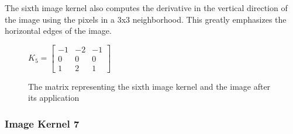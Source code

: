 \documentclass[12pt,letterpaper]{article}
\begin{document}
The sixth image kernel also computes the derivative in the vertical direction of the image using the pixels in a 3x3 neighborhood. This greatly emphasizes the horizontal edges of the image.
\begin{figure}[ht]
\centering
$K_5 = \begin{bmatrix}
-1 & -2 & -1\\
0 & 0 & 0\\
1 & 2 & 1
\end{bmatrix}$
\hspace{2cm} 
\caption{\small{The matrix representing the sixth image kernel and the image after its application}
\label{fig:ker6} }
\end{figure}

\subsubsection{Image Kernel 7}
\end{document}
